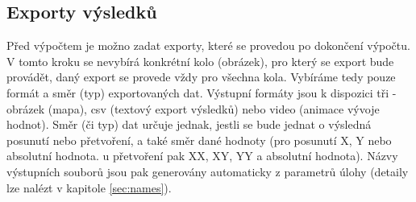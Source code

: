 \documentclass[a4paper,12pt]{article}
\begin{document}
\subsection{Exporty výsledků}
\begin{figure}[H]
\end{figure}
Před výpočtem je možno zadat exporty, které se provedou po dokončení výpočtu. V tomto kroku se nevybírá konkrétní kolo (obrázek), pro který se export bude provádět, daný export se provede vždy pro všechna kola. Vybíráme tedy pouze formát a směr (typ) exportovaných dat. Výstupní formáty jsou k dispozici tři - obrázek (mapa), csv (textový export výsledků) nebo video (animace vývoje hodnot). Směr (či typ) dat určuje jednak, jestli se bude jednat o výsledná posunutí nebo přetvoření, a také směr dané hodnoty (pro posunutí X, Y nebo absolutní hodnota. u přetvoření pak XX, XY, YY a absolutní hodnota). Názvy výstupních souborů jsou pak generovány automaticky z parametrů úlohy (detaily lze nalézt v kapitole \ref{sec:names}).
\newpage
\end{document}
